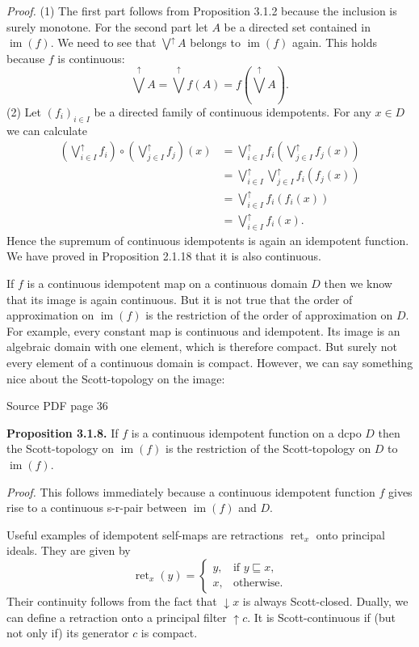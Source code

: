 \documentclass[11pt]{article}
\newcommand{\leanmarker}[2]{%
  \Needspace{3\baselineskip}%
  \marginnote{\hyperlink{#1}{\color{LeanTeal}\fbox{\scriptsize Lean}}}%
  \hypertarget{#1}{\textbf{#2.}}%
}
\newcommand{\sourcepage}[1]{\par\medskip\noindent\textcolor{SourceGray}{\scriptsize Source PDF page #1}\par\smallskip}
\begin{document}
\emph{Proof.} (1) The first part follows from Proposition 3.1.2 because the inclusion is surely monotone. For the second part let $A$ be a directed set contained in $\operatorname{im}(f)$. We need to see that $\bigvee^{\uparrow} A$ belongs to $\operatorname{im}(f)$ again. This holds because $f$ is continuous:
\[
  \bigvee^{\uparrow} A = \bigvee^{\uparrow} f(A) = f\left(\bigvee^{\uparrow} A\right).
\]
(2) Let $(f_i)_{i\in I}$ be a directed family of continuous idempotents. For any $x\in D$ we can calculate
\[
\begin{aligned}
\left(\bigvee^{\uparrow}_{i\in I} f_i\right)\circ
\left(\bigvee^{\uparrow}_{j\in I} f_j\right)(x)
&= \bigvee^{\uparrow}_{i\in I} f_i\left(\bigvee^{\uparrow}_{j\in I} f_j(x)\right) \\
&= \bigvee^{\uparrow}_{i\in I}\bigvee^{\uparrow}_{j\in I} f_i(f_j(x)) \\
&= \bigvee^{\uparrow}_{i\in I} f_i(f_i(x)) \\
&= \bigvee^{\uparrow}_{i\in I} f_i(x).
\end{aligned}
\]
Hence the supremum of continuous idempotents is again an idempotent function. We have proved in Proposition 2.1.18 that it is also continuous.

If $f$ is a continuous idempotent map on a continuous domain $D$ then we know that its image is again continuous. But it is not true that the order of approximation on $\operatorname{im}(f)$ is the restriction of the order of approximation on $D$. For example, every constant map is continuous and idempotent. Its image is an algebraic domain with one element, which is therefore compact. But surely not every element of a continuous domain is compact. However, we can say something nice about the Scott-topology on the image:

\sourcepage{36}
\leanmarker{prop-3-1-8}{Proposition 3.1.8} If $f$ is a continuous idempotent function on a dcpo $D$ then the Scott-topology on $\operatorname{im}(f)$ is the restriction of the Scott-topology on $D$ to $\operatorname{im}(f)$.

\emph{Proof.} This follows immediately because a continuous idempotent function $f$ gives rise to a continuous s-r-pair between $\operatorname{im}(f)$ and $D$.

Useful examples of idempotent self-maps are retractions $\operatorname{ret}_x$ onto principal ideals. They are given by
\[
  \operatorname{ret}_x(y)=
  \begin{cases}
    y, & \text{if } y\sqsubseteq x,\\
    x, & \text{otherwise.}
  \end{cases}
\]
Their continuity follows from the fact that $\downarrow x$ is always Scott-closed. Dually, we can define a retraction onto a principal filter $\uparrow c$. It is Scott-continuous if (but not only if) its generator $c$ is compact.
\end{document}
